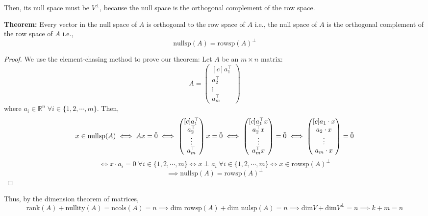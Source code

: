 \documentclass{article}
\begin{document}
Then, its null space must be $V^\perp$, because the null space is the orthogonal complement of the row space.
\begin{tcolorbox}
\textbf{Theorem:} Every vector in the null space of $A$ is orthogonal to the row space of $A$ i.e., the null space of $A$ is the orthogonal complement of the row space of $A$ i.e., 
$$\text{nullsp}(A)=\text{rowsp}(A)^\bot$$
\begin{proof}
We use the element-chasing method to prove our theorem:
Let $A$ be an $m \times n$ matrix:  
$$A=
\begin{pmatrix}[c]
                  a_1^\top \\
                  a_2^\top \\
                  \vdots \\
                  a_m^\top
\end{pmatrix}
$$
where $a_i \in \mathbb{R}^n \; \forall i \in \{1, 2, \cdots, m\}$. Then,
$$x \in \text{nullsp}(A) 
\iff Ax=\Tilde{0} 
\iff 
\begin{pmatrix}[c]
                  a_1^\top \\
                  a_2^\top \\
                  \vdots \\
                  a_m^\top
\end{pmatrix}
x = \Tilde{0}
\iff 
\begin{pmatrix}[c]
                  a_1^\top x \\
                  a_2^\top x \\
                  \vdots \\
                  a_m^\top x
\end{pmatrix}
=\Tilde{0}
\iff
\begin{pmatrix}[c]
                  a_1 \cdot x \\
                  a_2 \cdot x \\
                  \vdots \\
                  a_m \cdot x
\end{pmatrix}
=\Tilde{0}
$$
$$
\iff
x \cdot a_i =0 \; \forall i \in \{1, 2, \cdots, m\}
\iff
x \perp a_i \; \forall i \in \{1, 2, \cdots, m\}
\iff
x \in \text{rowsp}(A)^\bot
$$
$$\implies \text{nullsp}(A) = \text{rowsp}(A)^\bot$$
\end{proof}
\end{tcolorbox}
Thus, by the dimension theorem of matrices,
$$\text{rank}(A) + \text{nullity}(A) = \text{ncols}(A) = n \implies \text{dim rowsp}(A) + \text{dim nulsp}(A) = n \implies \text{dim} V + \text{dim} V^\perp = n \implies k + m = n$$
\end{document}
